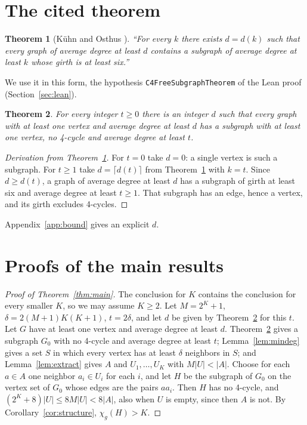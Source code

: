 \documentclass[11pt]{article}
\newtheorem{theorem}{Theorem}[section]
\theoremstyle{remark}
\begin{document}
\section{The cited theorem}\label{sec:cited}

\begin{theorem}[{Kühn and Osthus \cite[Theorem~1]{KO}}]\label{thm:koorig}
``For every $k$ there exists $d=d(k)$ such that every graph of average
degree at least $d$ contains a subgraph of average degree at least $k$
whose girth is at least six.''
\end{theorem}

We use it in this form, the hypothesis \texttt{C4FreeSubgraphTheorem} of
the Lean proof (Section~\ref{sec:lean}).

\begin{theorem}\label{thm:ko}
For every integer $t\ge0$ there is an integer $d$ such that every graph
with at least one vertex and average degree at least $d$ has a subgraph
with at least one vertex, no 4-cycle and average degree at least $t$.
\end{theorem}

\begin{proof}[Derivation from Theorem~\ref{thm:koorig}]
For $t=0$ take $d=0$: a single vertex is such a subgraph. For $t\ge1$ take
$d=\lceil d(t)\rceil$ from Theorem~\ref{thm:koorig} with $k=t$. Since $d\ge d(t)$,
a graph of average degree at least $d$ has a subgraph of girth at least six
and average degree at least $t\ge1$. That
subgraph has an edge, hence a vertex, and its girth excludes 4-cycles.
\end{proof}
Appendix~\ref{app:bound} gives an explicit $d$.

\section{Proofs of the main results}\label{sec:proofs}

\begin{proof}[Proof of Theorem~\ref{thm:main}]
The conclusion for $K$ contains the conclusion for every smaller $K$, so
we may assume $K\ge2$. Let $M=2^K+1$, $\delta=2(M+1)K(K+1)$, $t=2\delta$,
and let $d$ be given by Theorem~\ref{thm:ko} for this $t$. Let $G$ have at
least one vertex and average degree at least $d$. Theorem~\ref{thm:ko}
gives a subgraph $G_0$ with no 4-cycle and average degree at least $t$;
Lemma~\ref{lem:mindeg} gives a set $S$ in which every vertex has at least
$\delta$ neighbors in $S$; and Lemma~\ref{lem:extract} gives $A$ and
$U_1,\dots,U_K$ with $M|U|<|A|$. Choose for each $a\in A$ one neighbor
$a_i\in U_i$ for each $i$, and let $H$ be the subgraph of $G_0$ on the
vertex set of $G_0$ whose edges are the pairs $aa_i$. Then $H$ has no
4-cycle, and $(2^K+8)|U|\le8M|U|<8|A|$, also when $U$ is empty, since then
$A$ is not. By Corollary~\ref{cor:structure}, $\chi_g(H)>K$.
\end{proof}
\end{document}
